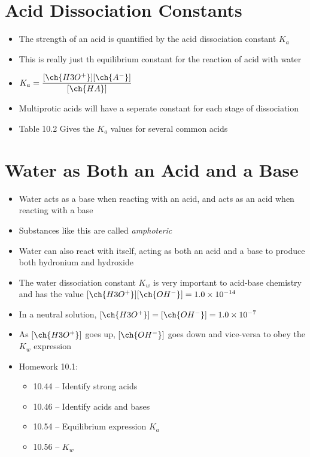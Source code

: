 \documentclass[12pt, openany, letterpaper]{memoir}
\begin{document}
\section{Acid Dissociation Constants}
\begin{itemize}
	\item The strength of an acid is quantified by the acid dissociation constant $K_a$
	\item This is really just th equilibrium constant for the reaction of acid with water
	\item $K_a=\dfrac{[\ch{H3O^+}][\ch{A^-}]}{[\ch{HA}]}$
	\item Multiprotic acids will have a seperate constant for each stage of dissociation
	\item Table 10.2 Gives the $K_a$ values for several common acids
\end{itemize}

\section{Water as Both an Acid and a Base}
\begin{itemize}
	\item Water acts as a base when reacting with an acid, and acts as an acid when reacting with a base
	\item Substances like this are called \emph{amphoteric}
	\item Water can also react with itself, acting as both an acid and a base to produce both hydronium and hydroxide
	\item The water dissociation constant $K_w$ is very important to acid-base chemistry and has the value $[\ch{H3O^+}][\ch{OH^-}]=1.0\times10^{-14}$
	\item In a neutral solution, $[\ch{H3O^+}] = [\ch{OH^-}] = 1.0\times10^{-7}$
	\item As $[\ch{H3O^+}]$ goes up, $[\ch{OH^-}]$ goes down and vice-versa to obey the $K_w$ expression
	\item Homework 10.1:
	      \begin{itemize}
		      \item 10.44 -- Identify strong acids
		      \item 10.46 -- Identify acids and bases
		      \item 10.54 -- Equilibrium expression $K_a$
		      \item 10.56 -- $K_w$
	      \end{itemize}
\end{itemize}
\end{document}
